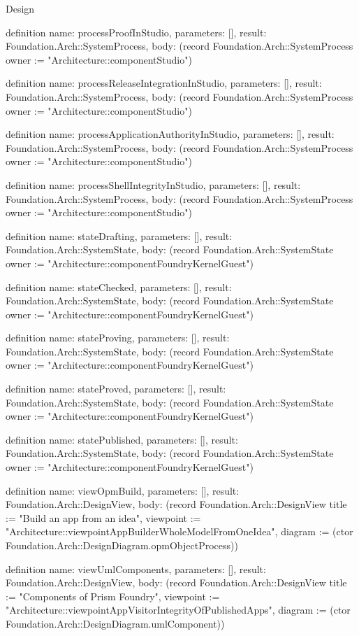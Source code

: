 \begin{lexlean}{Design}
\begin{semanticmodule}
definition{
  name: processProofInStudio,
  parameters: [],
  result: Foundation.Arch::SystemProcess,
  body: (record Foundation.Arch::SystemProcess {owner := "Architecture::componentStudio"})
}

definition{
  name: processReleaseIntegrationInStudio,
  parameters: [],
  result: Foundation.Arch::SystemProcess,
  body: (record Foundation.Arch::SystemProcess {owner := "Architecture::componentStudio"})
}

definition{
  name: processApplicationAuthorityInStudio,
  parameters: [],
  result: Foundation.Arch::SystemProcess,
  body: (record Foundation.Arch::SystemProcess {owner := "Architecture::componentStudio"})
}

definition{
  name: processShellIntegrityInStudio,
  parameters: [],
  result: Foundation.Arch::SystemProcess,
  body: (record Foundation.Arch::SystemProcess {owner := "Architecture::componentStudio"})
}

definition{
  name: stateDrafting,
  parameters: [],
  result: Foundation.Arch::SystemState,
  body: (record Foundation.Arch::SystemState {owner := "Architecture::componentFoundryKernelGuest"})
}

definition{
  name: stateChecked,
  parameters: [],
  result: Foundation.Arch::SystemState,
  body: (record Foundation.Arch::SystemState {owner := "Architecture::componentFoundryKernelGuest"})
}

definition{
  name: stateProving,
  parameters: [],
  result: Foundation.Arch::SystemState,
  body: (record Foundation.Arch::SystemState {owner := "Architecture::componentFoundryKernelGuest"})
}

definition{
  name: stateProved,
  parameters: [],
  result: Foundation.Arch::SystemState,
  body: (record Foundation.Arch::SystemState {owner := "Architecture::componentFoundryKernelGuest"})
}

definition{
  name: statePublished,
  parameters: [],
  result: Foundation.Arch::SystemState,
  body: (record Foundation.Arch::SystemState {owner := "Architecture::componentFoundryKernelGuest"})
}

definition{
  name: viewOpmBuild,
  parameters: [],
  result: Foundation.Arch::DesignView,
  body: (record Foundation.Arch::DesignView {title := "Build an app from an idea", viewpoint := "Architecture::viewpointAppBuilderWholeModelFromOneIdea", diagram := (ctor Foundation.Arch::DesignDiagram.opmObjectProcess)})
}

definition{
  name: viewUmlComponents,
  parameters: [],
  result: Foundation.Arch::DesignView,
  body: (record Foundation.Arch::DesignView {title := "Components of Prism Foundry", viewpoint := "Architecture::viewpointAppVisitorIntegrityOfPublishedApps", diagram := (ctor Foundation.Arch::DesignDiagram.umlComponent)})
}


\end{semanticmodule}
\end{lexlean}
